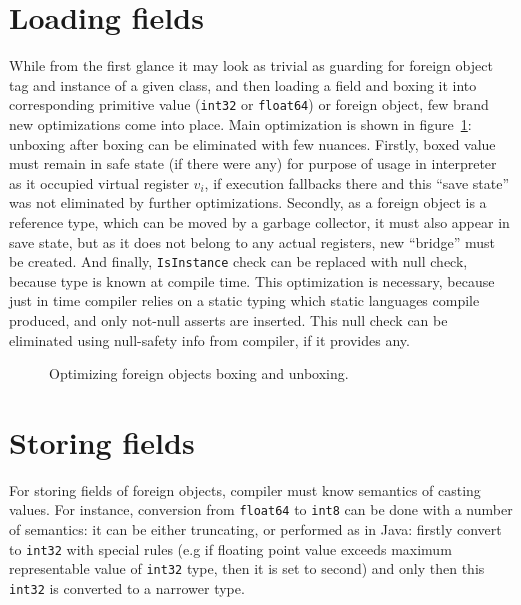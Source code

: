 \documentclass[times,specification,annotation]{itmo-student-thesis}
\begin{document}
\section{Loading fields}
While from the first glance it may look as trivial as guarding for foreign object tag and instance of a given class, and then loading a field and boxing it into corresponding primitive value (\texttt{int32} or \texttt{float64}) or foreign object, few brand new optimizations come into place. Main optimization is shown in figure~\ref{fig:field-opt}: unboxing after boxing can be eliminated with few nuances. Firstly, boxed value must remain in safe state (if there were any) for purpose of usage in interpreter as it occupied virtual register $v_i$, if execution fallbacks there and this ``save state'' was not eliminated by further optimizations. Secondly, as a foreign object is a reference type, which can be moved by a garbage collector, it must also appear in save state, but as it does not belong to any actual registers, new ``bridge'' must be created. And finally, \texttt{IsInstance} check can be replaced with null check, because type is known at compile time. This optimization is necessary, because just in time compiler relies on a static typing which static languages compile produced, and only not-null asserts are inserted. This null check can be eliminated using null-safety info from compiler, if it provides any.
\begin{figure}[H]
	\caption{Optimizing foreign objects boxing and unboxing.}\label{fig:field-opt}
	\centering
	\end{figure}

\section{Storing fields}
For storing fields of foreign objects, compiler must know semantics of casting values. For instance, conversion from \texttt{float64} to \texttt{int8} can be done with a number of semantics: it can be either truncating, or performed as in Java: firstly convert to \texttt{int32} with special rules (e.g if floating point value exceeds maximum representable value of \texttt{int32} type, then it is set to second) and only then this \texttt{int32} is converted to a narrower type.
\end{document}
